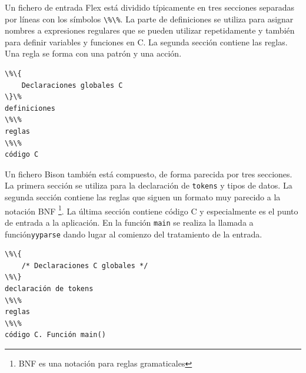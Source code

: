 Un fichero de entrada Flex está dividido típicamente en tres secciones separadas por líneas con los símbolos \verb|\%\%|. La parte de definiciones se utiliza para asignar nombres a expresiones regulares que se pueden utilizar repetidamente y también para definir variables y funciones en C. La segunda sección contiene las reglas. Una regla se forma con una patrón y una acción.

\begin{verbatim}
\%\{
	Declaraciones globales C
\}\%
definiciones
\%\% 
reglas
\%\% 
código C
\end{verbatim}

Un fichero Bison también está compuesto, de forma parecida por tres secciones. La primera sección se utiliza para la declaración de \verb|tokens| y tipos de datos. La segunda sección contiene las reglas que siguen un formato muy parecido a la notación BNF \footnote{BNF es una notación para reglas gramaticales}. La última sección contiene código C y especialmente es el punto de entrada a la aplicación. En la función \verb|main| se realiza la llamada a función\verb|yyparse| dando lugar al comienzo del tratamiento de la entrada.

\begin{verbatim}
\%\{
	/* Declaraciones C globales */
\%\}
declaración de tokens
\%\%
reglas
\%\%
código C. Función main()
\end{verbatim}
